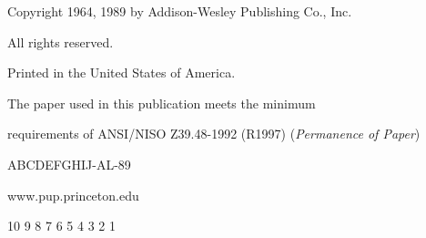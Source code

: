 \begin{titlepage}
Copyright \textcopyright{} 1964, 1989 by Addison-Wesley Publishing Co., Inc.

All rights reserved.\par
Printed in the United States of America.

The paper used in this publication meets the minimum\par
requirements of ANSI/NISO Z39.48-1992 (R1997) (\emph{Permanence of Paper})

ABCDEFGHIJ-AL-89

www.pup.princeton.edu

10 9 8 7 6 5 4 3 2 1
\end{titlepage}
